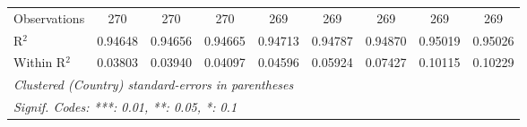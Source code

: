 \begin{table}[htbp]
\begin{tabular}{lcccccccc}
      Observations                            & 270             & 270             & 270      & 269      & 269      & 269      & 269      & 269\\  
      R$^2$                                   & 0.94648         & 0.94656         & 0.94665  & 0.94713  & 0.94787  & 0.94870  & 0.95019  & 0.95026\\  
      Within R$^2$                            & 0.03803         & 0.03940         & 0.04097  & 0.04596  & 0.05924  & 0.07427  & 0.10115  & 0.10229\\  
      \midrule \midrule
      \multicolumn{9}{l}{\emph{Clustered (Country) standard-errors in parentheses}}\\
      \multicolumn{9}{l}{\emph{Signif. Codes: ***: 0.01, **: 0.05, *: 0.1}}\\
   \end{tabular}
\end{table}


